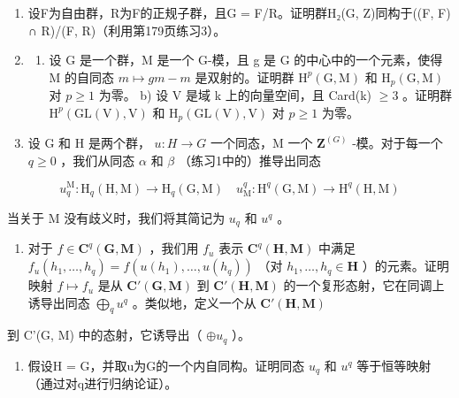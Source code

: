 \begin{enumerate}
\def\labelenumi{\arabic{enumi})}
\setcounter{enumi}{7}
\item
  设F为自由群，R为F的正规子群，且G = F/R。证明群H₂(G, Z)同构于((F, F) ∩ R)/(F, R)（利用第179页练习3）。
\item
  \begin{enumerate}
  \def\labelenumii{\alph{enumii})}
  \tightlist
  \item
    设 G 是一个群，M 是一个 G-模，且 g 是 G 的中心中的一个元素，使得 M 的自同态 \(m \mapsto gm - m\) 是双射的。证明群 \(\mathrm{H}^{p}(\mathrm{G}, \mathrm{M})\) 和 \(\mathrm{H}_{p}(\mathrm{G}, \mathrm{M})\) 对 \(p \geqslant 1\) 为零。 b) 设 V 是域 k 上的向量空间，且 Card(k) \(\geqslant 3\) 。证明群 \(\mathrm{H}^{p}(\mathrm{GL}(\mathrm{V}), \mathrm{V})\) 和 \(\mathrm{H}_{p}(\mathrm{GL}(\mathrm{V}), \mathrm{V})\) 对 \(p \geqslant 1\) 为零。
  \end{enumerate}
\item
  设 G 和 H 是两个群， \(u: H \to G\) 一个同态，M 一个 \(\mathbf{Z}^{(G)}\) -模。对于每一个 \(q \geqslant 0\) ，我们从同态 \(\alpha\) 和 \(\beta\) （练习1中的）推导出同态
\end{enumerate}

\[
u _ {q} ^ {\mathrm{M}}: \mathrm{H} _ {q} (\mathrm{H}, \mathrm{M}) \rightarrow \mathrm{H} _ {q} (\mathrm{G}, \mathrm{M}) \quad u _ {\mathrm{M}} ^ {q}: \mathrm{H} ^ {q} (\mathrm{G}, \mathrm{M}) \rightarrow \mathrm{H} ^ {q} (\mathrm{H}, \mathrm{M})
\]

当关于 M 没有歧义时，我们将其简记为 \(u_q\) 和 \(u^q\) 。

\begin{enumerate}
\def\labelenumi{\alph{enumi})}
\tightlist
\item
  对于 \(f \in \mathbf{C}^q(\mathbf{G}, \mathbf{M})\) ，我们用 \(f_u\) 表示 \(\mathbf{C}^q(\mathbf{H}, \mathbf{M})\) 中满足 \(f_u(h_1, \ldots, h_q) = f(u(h_1), \ldots, u(h_q))\) （对 \(h_1, \ldots, h_q \in \mathbf{H}\) ）的元素。证明映射 \(f \mapsto f_u\) 是从 \(\mathbf{C}'(\mathbf{G}, \mathbf{M})\) 到 \(\mathbf{C}'(\mathbf{H}, \mathbf{M})\) 的一个复形态射，它在同调上诱导出同态 \(\bigoplus_{q} u^q\) 。类似地，定义一个从 \(\mathbf{C}'(\mathbf{H}, \mathbf{M})\)
\end{enumerate}

到 C'(G, M) 中的态射，它诱导出（ \(\oplus u_{q}\) ）。

\begin{enumerate}
\def\labelenumi{\alph{enumi})}
\setcounter{enumi}{1}
\tightlist
\item
  假设H = G，并取u为G的一个内自同构。证明同态 \(u_{q}\) 和 \(u^{q}\) 等于恒等映射（通过对q进行归纳论证）。
\end{enumerate}

